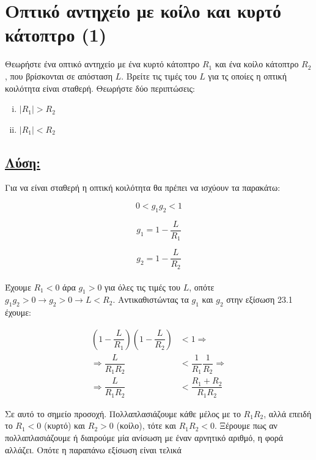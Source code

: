 \documentclass[a4paper,11pt,titlepage]{article}
\numberwithin{equation}{section} %
\begin{document}
\section{Οπτικό αντηχείο με κοίλο και κυρτό κάτοπτρο (1)}

Θεωρήστε ένα οπτικό αντηχείο με ένα κυρτό κάτοπτρο $R_1$ και ένα κοίλο κάτοπτρο $R_2$, που βρίσκονται σε απόσταση $L$. Βρείτε τις τιμές του $L$ για τς οποίες η οπτική κοιλότητα είναι σταθερή. Θεωρήστε δύο περιπτώσεις:
\begin{enumerate}[(i)]
 \item $|R_1|>R_2$
 \item $|R_1|<R_2$
\end{enumerate}

\subsection*{\underline{Λύση:}}

Για να είναι σταθερή η οπτική κοιλότητα θα πρέπει να ισχύουν τα παρακάτω:

\begin{equation}
 0<g_1g_2<1
\end{equation}

\begin{equation}
  g_1=1-\dfrac{L}{R_1}
\end{equation}

\begin{equation}
  g_2=1-\dfrac{L}{R_2}
\end{equation}
\\[0.5cm]

Έχουμε $R_1<0$ άρα $g_1>0$ για όλες τις τιμές του $L$, οπότε $g_1g_2>0\rightarrow g_2>0\rightarrow L<R_2$. Αντικαθιστώντας τα $g_1$ και $g_2$ στην εξίσωση 23.1 έχουμε:

\begin{equation}
\begin{split}
  (1-\dfrac{L}{R_1})(1-\dfrac{L}{R_2})&<1\Rightarrow\\
\Rightarrow \dfrac{L}{R_1R_2}&<\dfrac{1}{R_1}\dfrac{1}{R_2}\Rightarrow\\
\Rightarrow \dfrac{L}{R_1R_2}&<\dfrac{R_1+R_2}{R_1R_2}
\end{split}
\end{equation}

Σε αυτό το σημείο προσοχή. Πολλαπλασιάζουμε κάθε μέλος με το $R_1R_2$, αλλά επειδή το $R_1<0$ (κυρτό) και $R_2>0$ (κοίλο), τότε και $R_1R_2<0$. Ξέρουμε πως αν πολλαπλασιάζουμε ή διαιρούμε μία ανίσωση με έναν αρνητικό αριθμό, η φορά αλλάζει. Οπότε η παραπάνω εξίσωση είναι τελικά 
\end{document}

